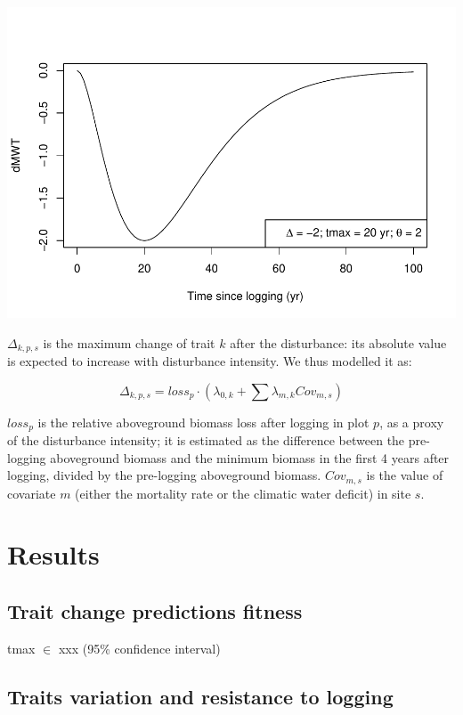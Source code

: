 \documentclass[]{elsarticle} %
\makeatletter
\def\maxwidth{\ifdim\Gin@nat@width>\linewidth\linewidth
\else\Gin@nat@width\fi}
\let\Oldincludegraphics\includegraphics
\renewcommand{\includegraphics}[1]{\Oldincludegraphics[width=\maxwidth]{#1}}
\makeatother
\begin{document}
\includegraphics{rticle_tmfo_functional_files/figure-latex/unnamed-chunk-1-1.pdf}

\(\Delta_{k,p,s}\) is the maximum change of trait \(k\) after the
disturbance: its absolute value is expected to increase with disturbance
intensity. We thus modelled it as:

\begin{equation} 
\Delta_{k,p,s} = loss_p \cdot (\lambda_{0,k} + \sum \lambda_{m,k} Cov_{m,s}) 
\end{equation}

\(loss_p\) is the relative aboveground biomass loss after logging in
plot \(p\), as a proxy of the disturbance intensity; it is estimated as
the difference between the pre-logging aboveground biomass and the
minimum biomass in the first 4 years after logging, divided by the
pre-logging aboveground biomass. \(Cov_{m,s}\) is the value of covariate
\(m\) (either the mortality rate or the climatic water deficit) in site
\(s\).

\section{Results}\label{results}

\subsection{Trait change predictions
fitness}\label{trait-change-predictions-fitness}

tmax \(\in\) xxx (95\% confidence interval)

\subsection{Traits variation and resistance to
logging}\label{traits-variation-and-resistance-to-logging}
\end{document}
